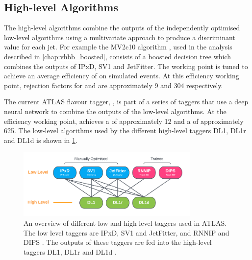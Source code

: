 \subsection{High-level Algorithms}\label{sec:high_level_algs}

The high-level algorithms combine the outputs of the independently optimised low-level algorithms using a multivariate approach to produce a discriminant value for each jet.
For example the MV2c10 algorithm \cite{ATL-PHYS-PUB-2015-022,FTAG-2018-01,ATL-PHYS-PUB-2017-013}, used in the analysis described in \cref{chap:vhbb_boosted}, consists of a boosted decision tree which combines the outputs of IPxD, SV1 and JetFitter.
The working point is tuned to achieve an average \bjet efficiency of  on simulated \ttbar events.
At this efficiency working point, rejection factors for \cjets and \ljets are approximately 9 and 304 respectively.

The current ATLAS flavour tagger, \DLr \cite{ATL-PHYS-PUB-2017-013}, is part of a series of taggers that use a deep neural network to combine the outputs of the low-level algorithms.
At the  efficiency working point, \DLr achieves a \crej of approximately 12 and a \lrej of approximately 625.
The low-level algorithms used by the different high-level taggers DL1, DL1r and DL1d is shown in \cref{fig:high_low_taggers}.



\begin{figure}[!htbp]
  \centering
  \includegraphics[width=0.8\textwidth]{chapters/3.tracking/figs/high_low_taggers.pdf}
  \caption{
    An overview of different low and high level taggers used in ATLAS.
    The low level taggers are IPxD, SV1 and JetFitter, and RNNIP and DIPS \cite{FTAG-2018-01,ATL-PHYS-PUB-2017-011,ATL-PHYS-PUB-2017-003,ATL-PHYS-PUB-2020-014}.
    The outputs of these taggers are fed into the high-level taggers DL1, DL1r and DL1d \cite{ATL-PHYS-PUB-2017-013,ATLAS:2022qxm}.
  }
  \label{fig:high_low_taggers}
\end{figure}